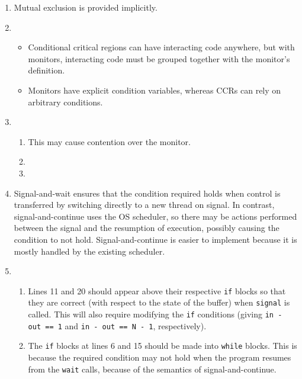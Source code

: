 \documentclass{article}
\begin{document}
\begin{enumerate}
  \item Mutual exclusion is provided implicitly.
  \item
    \begin{itemize}
      \item Conditional critical regions can have interacting code anywhere, but with monitors, interacting code must be grouped together with the monitor's definition.
      \item Monitors have explicit condition variables, whereas CCRs can rely on arbitrary conditions.
    \end{itemize}
  \item
    \begin{enumerate}
      \item This may cause contention over the monitor.
      \item
      \item
    \end{enumerate}
  \item Signal-and-wait ensures that the condition required holds when control is transferred by switching directly to a new thread on signal. In contrast, signal-and-continue uses the OS scheduler, so there may be actions performed between the signal and the resumption of execution, possibly causing the condition to not hold. Signal-and-continue is easier to implement because it is mostly handled by the existing scheduler.
  \item
    \begin{enumerate}
      \item Lines 11 and 20 should appear above their respective \texttt{if} blocks so that they are correct (with respect to the state of the buffer) when \texttt{signal} is called. This will also require modifying the \texttt{if} conditions (giving \texttt{in - out == 1} and \texttt{in - out == N - 1}, respectively).
      \item The \texttt{if} blocks at lines 6 and 15 should be made into \texttt{while} blocks. This is because the required condition may not hold when the program resumes from the \texttt{wait} calls, because of the semantics of signal-and-continue.
    \end{enumerate}
\end{enumerate}
\end{document}
